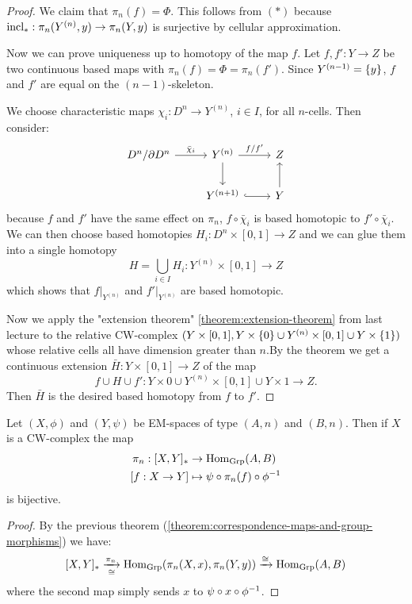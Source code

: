 \begin{proof}
We claim that $\pi_n(f)=\Phi$. This follows from $(*)$ because $\operatorname{incl}_*:\pi_n(Y^{(n)},y)\to\pi_n(Y,y)$ is surjective by cellular approximation.

Now we can prove uniqueness up to homotopy of the map $f$. Let $f,f':Y\to Z$ be two continuous based maps with $\pi_n(f)=\Phi=\pi_n(f')$. Since $Y^{({n-1})}=\{y\}$, $f$ and $f'$ are equal on the $(n-1)$-skeleton.

We choose characteristic maps $\chi_i:D^n\to Y^{(n)}$, $i\in I$, for all $n$-cells. Then consider:
\[
\begin{tikzcd}
D^n/\de D^n \ar[r,"\bar\chi_i"] & Y^{(n)} \ar[d] \ar[r,"f/f'"] & Z\\
& Y^{(n+1)} \ar[r,hook] & Y \ar[u]
\end{tikzcd}
\]
because $f$ and $f'$ have the same effect on $\pi_n$, $f\circ\bar\chi_i$ is based homotopic to $f'\circ\bar\chi_i$. We can then choose based homotopies $H_i:D^n\times[0,1]\to Z$ and we can glue them into a single homotopy
\[H=\bigcup_{i\in I}H_i:Y^{(n)}\times[0,1]\to Z\]
which shows that $f|_{Y^{(n)}}$ and $f'|_{Y^{(n)}}$ are based homotopic.

Now we apply the "extension theorem" \ref{theorem:extension-theorem} from last lecture to the relative CW-complex $(Y\times[0,1],Y\times\{0\}\cup Y^{(n)}\times[0,1]\cup Y\times\{1\})$ whose relative cells all have dimension greater than $n$.By the theorem we get a continuous extension $\bar H:Y\times[0,1]\to Z$ of the map
\[f\cup H\cup f':Y\times0\cup Y^{(n)}\times[0,1]\cup Y\times1\to Z.\]
Then $\bar H$ is the desired based homotopy from $f$ to $f'$.
\end{proof}

\begin{theorem}\label{theorem:correspondence-maps-and-group-morphisms-EM}
Let $(X,\phi)$ and $(Y,\psi)$ be EM-spaces of type $(A,n)$ and $(B,n)$. Then if $X$ is a CW-complex the map
\begin{align*}
    \pi_n:[X,Y]_*&\to\Hom_\Grp(A,B)\\
    [f:X\to Y]&\mapsto\psi\circ\pi_n(f)\circ\phi^\inv
\end{align*}
is bijective.
\end{theorem}

\begin{proof}
By the previous theorem (\ref{theorem:correspondence-maps-and-group-morphisms}) we have:
\[
    [X,Y]_*\underset{\cong}{\xrightarrow{\pi_n}}\operatorname{Hom}_{\mathrm{Grp}}(\pi_n(X,x),\pi_n(Y,y))\xrightarrow{\cong}\operatorname{Hom}_{\mathrm{Grp}}(A,B)
\]
where the second map simply sends $x$ to $\psi\circ x\circ\phi^\inv$.
\end{proof}

